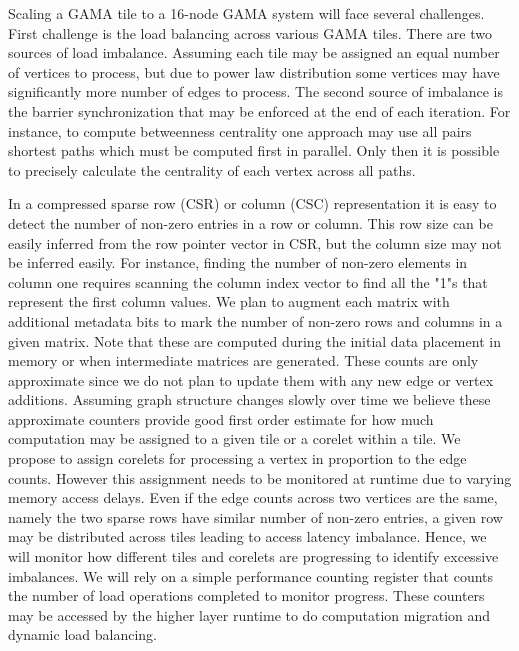 \noindent
Scaling a GAMA tile to a 16-node GAMA system will face several challenges. First challenge is the load balancing across various  GAMA tiles. There are two sources of load imbalance. Assuming each tile may be assigned an equal number of vertices to process, but due to power law distribution some vertices may have significantly more number of edges to process. The second source of imbalance is the barrier synchronization that may be enforced at the end of each iteration. For instance, to compute betweenness centrality one approach may use all  pairs shortest paths which must be computed first in parallel. Only then it is possible to precisely calculate the centrality of each vertex across all paths. 

In a compressed sparse row (CSR) or column (CSC) representation it is easy to detect the number of non-zero entries in a row or column.  This row size can be easily inferred from the row pointer vector in CSR, but the column size may not be inferred easily. For instance, finding the number of non-zero elements in column one requires scanning the column index vector to find all the "1"s that represent the first column values.  We plan to augment each matrix with additional metadata bits to mark the number of non-zero rows and columns in a given matrix. Note that these are computed during the  initial data placement in memory or when intermediate matrices are generated. These counts are only approximate since we do not plan to update them with any new edge or vertex additions. Assuming graph structure changes slowly over time we believe these approximate counters provide good first order estimate for how much computation may be assigned to a given tile or a corelet within a tile. We propose to assign  corelets for processing a vertex in proportion to the edge counts. However this assignment needs to be monitored at runtime due to varying memory access delays. Even if the edge counts across two vertices are the same, namely the two sparse rows have similar number of non-zero entries, a given row may be distributed across tiles leading to access latency imbalance. Hence, we will monitor how different tiles and corelets are  progressing to identify excessive imbalances. We will rely on a simple performance counting register that counts the number of load operations completed to monitor progress. These counters may be accessed by the higher layer runtime to do computation migration and dynamic load balancing. %

